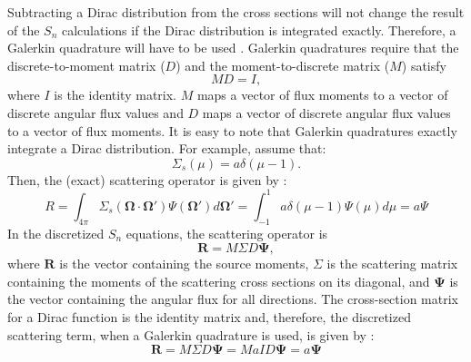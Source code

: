\documentclass[preprint,10pt]{elsarticle}
\newcommand\bo{\boldsymbol{\Omega}}
\newcommand\bs{\boldsymbol}
\renewcommand{\(}{\left(}
\renewcommand{\)}{\right)}
\renewcommand{\[}{\left[}
\renewcommand{\]}{\right]}
\begin{document}
Subtracting a Dirac distribution from the cross sections will not change the result of the $S_n$ 
calculations if the Dirac distribution is integrated exactly. Therefore, a Galerkin quadrature
will have to be used \cite{graal}. Galerkin quadratures require that the discrete-to-moment matrix ($D$)
and the moment-to-discrete matrix ($M$) satisfy
%
\begin{equation}
MD = I,
\end{equation}
%
where $I$ is the identity matrix. $M$ maps a vector of flux moments to a 
vector of discrete angular flux values and $D$ maps a vector of discrete 
angular flux values to a vector of flux moments. It is easy to note that Galerkin quadratures exactly 
integrate a Dirac distribution. For example, assume that:
%
\begin{equation}
\Sigma_s(\mu) = a\delta(\mu-1).
\end{equation}
%
Then, the (exact) scattering operator is given by :
%
\begin{equation}
R= \int_{4\pi} \Sigma_s(\bo\cdot\bo')\Psi(\bo')d\bo'
=\int_{-1}^1 a\delta(\mu-1)\Psi(\mu)d\mu
=a\Psi
\end{equation}
%
In the discretized $S_n$ equations, the scattering operator is
%
\begin{equation}
\bs{R} = M\Sigma D \bs{\Psi},
\end{equation}
%
where $\bs{R}$ is the vector containing the source moments, $\Sigma$ is the scattering
matrix containing the moments of the scattering cross sections on its
diagonal, and $\bs{\Psi}$ is the vector containing the angular flux for all directions.
The cross-section matrix for a Dirac function is the identity matrix and,
therefore, the discretized scattering term, when a Galerkin quadrature is used, is given by :
%
\begin{equation}
\bs{R} = M\Sigma D \bs{\Psi} = M aI D \bs{\Psi} =a\bs{\Psi}
\end{equation}
%
\end{document}
